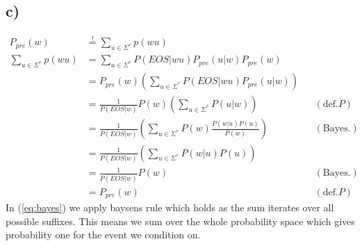 \documentclass[a4paper,12pt]{ETHexercise}
\begin{document}
\subsection*{c)}
\begin{align}
    P_{pre}(w) &\stackrel{!}{=} \sum_{u\in\Sigma^*}p(wu)\\
    \sum_{u\in\Sigma^*}p(wu) &= \sum_{u \in \Sigma^*}P(EOS|wu)P_{pre}(u|w)P_{pre}(w)\\
    &= P_{pre}(w) \left(\sum_{u \in \Sigma^*}P(EOS|wu)P_{pre}(u|w)\right)\\
    &= \frac{1}{P(EOS|w)} P(w) \left(\sum_{u \in \Sigma^*}P(u|w)\right) &&(\text{def.} P)\\
    &= \frac{1}{P(EOS|w)} \left(\sum_{u \in \Sigma^*}P(w)\frac{P(w|u)P(u)}{P(w)}\right) &&(\text{Bayes.}) \label{eq:bayes}\\
    &= \frac{1}{P(EOS|w)} \left(\sum_{u \in \Sigma^*}P(w|u)P(u)\right) \\
    &= \frac{1}{P(EOS|w)} P(w) &&(\text{Bayes.})\\
    &= P_{pre}(w) &&(\text{def.} P)
\end{align}
In (\ref{eq:bayes}) we apply baysens rule which holds as the sum iterates over all possible suffixes. This means we sum over the whole probability space which gives probability one for the event we condition on.
\end{document}
